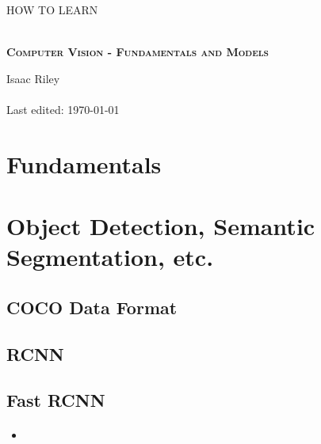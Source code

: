 \documentclass[a4, 12pt]{article}
\begin{document}
\begin{titlepage}


\thispagestyle{fancy}

\vphantom{x}

\vspace{0.5in}

\center


\textsc{\large HOW TO LEARN}

\vspace{0.5in}

\noindent\makebox[\linewidth]{\rule{\linewidth}{1.2pt}}\\
\vspace{2mm}
\textsc{ \textbf{\large Computer Vision - Fundamentals and Models }}
\noindent\makebox[\linewidth]{\rule{\linewidth}{1.2pt}}

\vspace{2.5in}
Isaac Riley\\~\\

Last edited: \today

\end{titlepage}

\newpage

\setcounter{page}{2}
\tableofcontents
\newpage

\section{Fundamentals}


\section{Object Detection, Semantic Segmentation, etc.}

\subsection{COCO Data Format}

\subsection{RCNN}


\subsection{Fast RCNN}
\paragraph{}
\begin{itemize}
    \item 
\end{itemize}
\end{document}

